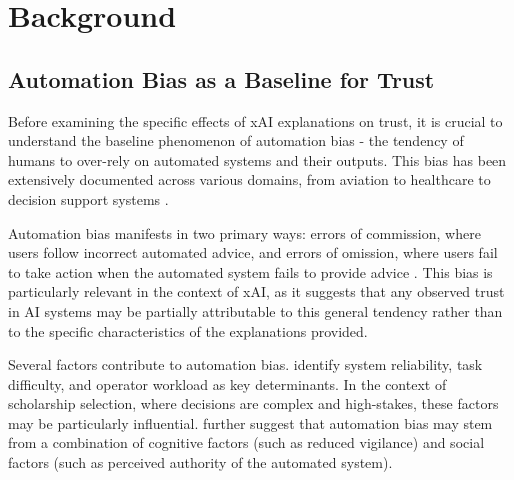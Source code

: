 \section{Background}

\subsection{Automation Bias as a Baseline for Trust}


Before examining the specific effects of xAI explanations on trust, it is crucial to understand the baseline phenomenon of automation bias - the tendency of humans to over-rely on automated systems and their outputs. This bias has been extensively documented across various domains, from aviation to healthcare to decision support systems \cite{mosier_automation_1996, parasuraman_automation_2000, skitka_automation_1999}.

Automation bias manifests in two primary ways: errors of commission, where users follow incorrect automated advice, and errors of omission, where users fail to take action when the automated system fails to provide advice \cite{mosier_automation_1996}. This bias is particularly relevant in the context of xAI, as it suggests that any observed trust in AI systems may be partially attributable to this general tendency rather than to the specific characteristics of the explanations provided.

Several factors contribute to automation bias. \textcite{parasuraman_automation_2000} identify system reliability, task difficulty, and operator workload as key determinants. In the context of scholarship selection, where decisions are complex and high-stakes, these factors may be particularly influential. \textcite{skitka_automation_1999} further suggest that automation bias may stem from a combination of cognitive factors (such as reduced vigilance) and social factors (such as perceived authority of the automated system).

